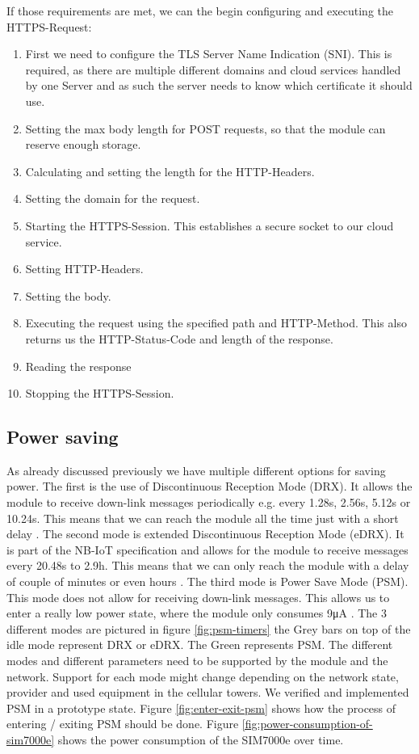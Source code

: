 If those requirements are met, we can the begin configuring and executing the HTTPS-Request:

\begin{enumerate}
    \item First we need to configure the TLS Server Name Indication (SNI). This is required, as there are multiple different domains and cloud services handled by one Server and as such the server needs to know which certificate it should use.
    \item  Setting the max body length for POST requests, so that the module can reserve enough storage.
    \item Calculating and setting the length for the HTTP-Headers.
    \item Setting the domain for the request.
    \item Starting the HTTPS-Session. This establishes a secure socket to our cloud service.
    \item Setting HTTP-Headers.
    \item Setting the body.
    \item Executing the request using the specified path and HTTP-Method. This also returns us the HTTP-Status-Code and length of the response.
    \item Reading the response
    \item Stopping the HTTPS-Session.
\end{enumerate}

\subsection{Power saving}

As already discussed previously we have multiple different options for saving power. 
The first is the use of Discontinuous Reception Mode (DRX). It allows the module to receive down-link messages periodically e.g. every 1.28s, 2.56s, 5.12s or 10.24s. This means that we can reach the module all the time just with a short delay \cite{SIM7000E_LOW_POWER_APPLICATION_NOTE}.
The second mode is extended Discontinuous Reception Mode (eDRX). It is part of the NB-IoT specification and allows for the module to receive messages every 20.48s to 2.9h. This means that we can only reach the module with a delay of couple of minutes or even hours \cite{SIM7000E_LOW_POWER_APPLICATION_NOTE}.
The third mode is Power Save Mode (PSM). This mode does not allow for receiving down-link messages. This allows us to enter a really low power state, where the module only consumes 9μA \cite{SIMCOM_SIM7000E}.
The 3 different modes are pictured in figure \ref{fig:psm-timers} the Grey bars on top of the idle mode represent DRX or eDRX. The Green represents PSM.
The different modes and different parameters need to be supported by the module and the network. Support for each mode might change depending on the network state, provider and used equipment in the cellular towers.
We verified and implemented PSM in a prototype state. Figure \ref{fig:enter-exit-psm} shows how the process of entering / exiting PSM should be done. Figure \ref{fig:power-consumption-of-sim7000e} shows the power consumption of the SIM7000e over time.

